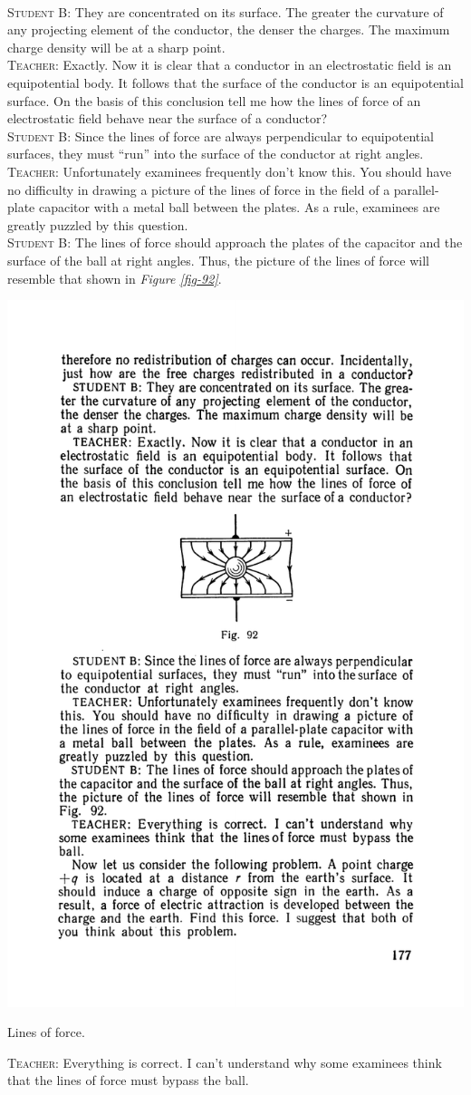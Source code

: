 \documentclass[a4paper,sfsidenotes]{tufte-book}
\begin{document}
\\
\textsc{Student B:} They are concentrated on its surface. The greater the curvature of any projecting element of the conductor, the denser the charges. The maximum charge density will be at a sharp point.
\\
\textsc{Teacher:} Exactly. Now it is clear that a conductor in an electrostatic field is an equipotential body. It follows that the surface of the conductor is an equipotential surface. On the basis of this conclusion tell me how the lines of force of an electrostatic field behave near the surface of a conductor? 
\\
\textsc{Student B:} Since the lines of force are always perpendicular to equipotential surfaces, they must ``run'' into the surface of the conductor at right angles.
\\
\textsc{Teacher:} Unfortunately examinees frequently don't know this. You should have no difficulty in drawing a picture of the lines of force in the field of a parallel-plate capacitor with a metal ball between the plates. As a rule, examinees are greatly puzzled by this question.
\\
\textsc{Student B:} The lines of force should approach the plates of the capacitor and the surface of the ball at right angles. Thus, the picture of the lines of force will resemble that shown in \emph{Figure \ref{fig-92}}.
\begin{marginfigure}%
\centering
\includegraphics[width=0.8\linewidth]{fig-092a}
\caption{Lines of force.}
\label{fig-92}
\end{marginfigure}
\textsc{Teacher:} Everything is correct. I can't understand why some examinees think that the lines of force must bypass the ball.
\end{document}

